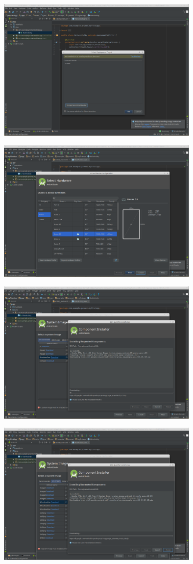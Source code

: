 \documentclass[french,a4paper,12pt]{report}
\begin{document}
\includegraphics[width=10cm]{6.png}

\includegraphics[width=10cm]{7.png}

\includegraphics[width=10cm]{8.png}

\includegraphics[width=10cm]{9.png}
\end{document}
